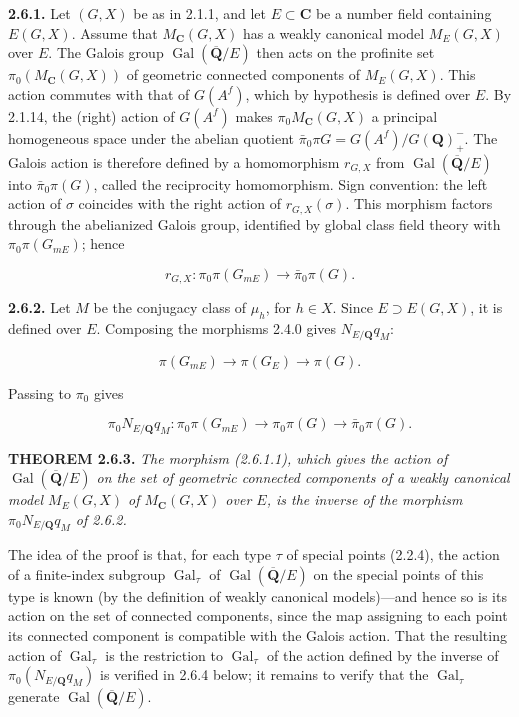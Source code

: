 \documentclass[10pt,a4paper]{article}
\begin{document}
\textbf{2.6.1.} Let \((G,X)\) be as in 2.1.1, and let \(E\subset\mathbf C\) be a number field containing \(E(G,X)\). Assume that \(M_{\mathbf C}(G,X)\) has a weakly canonical model \(M_E(G,X)\) over \(E\). The Galois group \(\operatorname{Gal}(\overline{\mathbf Q}/E)\) then acts on the profinite set \(\pi_0(M_{\mathbf C}(G,X))\) of geometric connected components of \(M_E(G,X)\). This action commutes with that of \(G(A^f)\), which by hypothesis is defined over \(E\). By 2.1.14, the (right) action of \(G(A^f)\) makes \(\pi_0M_{\mathbf C}(G,X)\) a principal homogeneous space under the abelian quotient \(\bar\pi_0\pi G=G(A^f)/G(\mathbf Q)_+^{-}\). The Galois action is therefore defined by a homomorphism \(r_{G,X}\) from \(\operatorname{Gal}(\overline{\mathbf Q}/E)\) into \(\bar\pi_0\pi(G)\), called the reciprocity homomorphism. Sign convention: the left action of \(\sigma\) coincides with the right action of \(r_{G,X}(\sigma)\). This morphism factors through the abelianized Galois group, identified by global class field theory with \(\pi_0\pi(G_{mE})\); hence

\[
r_{G,X}:\pi_0\pi(G_{mE})\longrightarrow\bar\pi_0\pi(G). \tag{2.6.1.1}
\]

\textbf{2.6.2.} Let \(M\) be the conjugacy class of \(\mu_h\), for \(h\in X\). Since \(E\supset E(G,X)\), it is defined over \(E\). Composing the morphisms 2.4.0 gives \(N_{E/\mathbf Q}q_M\):

\[
\pi(G_{mE})\longrightarrow\pi(G_E)\longrightarrow\pi(G).
\]

Passing to \(\pi_0\) gives

\[
\pi_0N_{E/\mathbf Q}q_M:\pi_0\pi(G_{mE})\longrightarrow\pi_0\pi(G)\longrightarrow\bar\pi_0\pi(G). \tag{2.6.2.1}
\]

\textbf{THEOREM 2.6.3.} \emph{The morphism (2.6.1.1), which gives the action of \(\operatorname{Gal}(\overline{\mathbf Q}/E)\) on the set of geometric connected components of a weakly canonical model \(M_E(G,X)\) of \(M_{\mathbf C}(G,X)\) over \(E\), is the inverse of the morphism \(\pi_0N_{E/\mathbf Q}q_M\) of 2.6.2.}

The idea of the proof is that, for each type \(\tau\) of special points (2.2.4), the action of a finite-index subgroup \(\operatorname{Gal}_\tau\) of \(\operatorname{Gal}(\overline{\mathbf Q}/E)\) on the special points of this type is known (by the definition of weakly canonical models)---and hence so is its action on the set of connected components, since the map assigning to each point its connected component is compatible with the Galois action. That the resulting action of \(\operatorname{Gal}_\tau\) is the restriction to \(\operatorname{Gal}_\tau\) of the action defined by the inverse of \(\pi_0(N_{E/\mathbf Q}q_M)\) is verified in 2.6.4 below; it remains to verify that the \(\operatorname{Gal}_\tau\) generate \(\operatorname{Gal}(\overline{\mathbf Q}/E)\).
\end{document}
